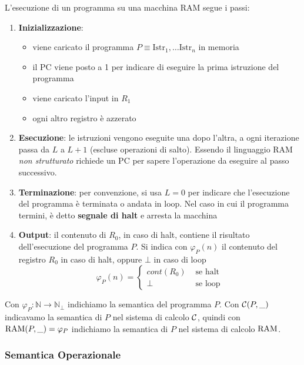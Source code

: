 L'esecuzione di un programma su una macchina RAM segue i passi:
\begin{enumerate}
	\item \textbf{Inizializzazione}:
	\begin{itemize}
		\item viene caricato il programma $P \equiv \text{Istr}_1, \dots \text{Istr}_n$ in memoria
		
        \item il PC viene posto a 1 per indicare di eseguire la prima istruzione del programma
		
        \item viene caricato l'input in $R_1$
		
        \item ogni altro registro è azzerato
	\end{itemize}
	
    \item \textbf{Esecuzione}: le istruzioni vengono eseguite una dopo l'altra, a ogni iterazione passa da $L$ a $L+1$ (escluse operazioni di salto). Essendo il linguaggio RAM \textit{non strutturato} richiede un PC per sapere l'operazione da eseguire al passo successivo.
	
    \item \textbf{Terminazione}: per convenzione, si usa $L = 0$ per indicare che l'esecuzione del programma è terminata o andata in loop. Nel caso in cui il programma termini, è detto \textbf{segnale di halt} e arresta la macchina
	
    \item \textbf{Output}: il contenuto di $R_0$, in caso di halt, contiene il risultato dell'esecuzione del programma $P$. Si indica con $\varphi_P(n)$ il contenuto del registro $R_0$ in caso di halt, oppure $\bot$ in caso di loop
	$$ 
	\varphi_P (n) = \begin{cases}
		cont(R_0) & \text{ se halt} \\
		\bot & \text{ se loop}
	\end{cases}
	$$
\end{enumerate}

Con $\varphi_P: \mathbb{N} \rightarrow \mathbb{N}_\bot$ indichiamo la semantica del programma $P$. Con $\mathcal{C}(P,\_)$ indicavamo la semantica di $P$ nel sistema di calcolo $\mathcal{C}$, quindi con $\text{RAM}(P,\_) = \varphi_P$ indichiamo la semantica di $P$ nel sistema di calcolo $\text{RAM}$.

\subsubsection{Semantica Operazionale}

